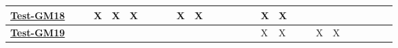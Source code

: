 \documentclass[12pt, titlepage]{article}
\begin{document}
\begin{landscape}
\begin{table}[H]
\begin{adjustwidth}{-0.0in}{-1in}
{\begin{tabular}{l|l|l|l|l|l|l|l|l|l|l|l|l|l|l|l|l|l|l|l|l|l|l|l|l|l|l|}
\multicolumn{1}{|l|}{\hyperref[Test-GM18]{\textbf{Test-GM18}}} &              &              & X            & X            & X            &              &              &              & X            & X             &               &               &               &               &               & X             & X             &               &               &               &               &               &             &             &             &             \\ \hline
\multicolumn{1}{|l|}{\hyperref[Test-GM19]{\textbf{Test-GM19}}} &              &              &              &              &              &              &              &              &              &               &               &               &               &               &               & X             & X             &               &               & X             & X             &               &             &             &             &             \\ \hline


\end{tabular}}
\end{adjustwidth}
\end{table}
\end{landscape}
\end{document}

